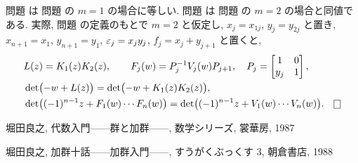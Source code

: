 \documentclass[12pt,twoside]{jarticle}
\begin{document}
\begin{rem}
  問題  は
  問題  の $m=1$ の場合に等しい.
  問題  は
  問題  の $m=2$ の場合と同値である.
  実際, 問題  の定義のもとで %
  $m=2$ と仮定し,  $x_j=x_{1j}$, $y_j=y_{2j}$ と置き, 
  $x_{n+1}=x_1$, $y_{n+1}=y_1$, 
  $\varepsilon_j = x_jy_j$, $f_j = x_j+y_{j+1}$ と置くと, 
  \begin{align*}
    &
    L(z) = K_1(z)K_2(z),
    \qquad
    F_j(w) = P_j^{-1} V_j(w) P_{j+1},
    \quad
    P_j = 
    \begin{bmatrix}
      1   & 0 \\
      y_j & 1 \\
    \end{bmatrix},
    \\ &
    \det\bigl( -w + L(z) \bigr)
    =
    \det\bigl( -w + K_1(z)K_2(z) \bigr),
    \\ &
    \det\bigl( (-1)^{n-1}z + F_1(w)\cdots F_n(w) \bigr)
    =
    \det\bigl( (-1)^{n-1}z + V_1(w)\cdots V_n(w) \bigr).
    \qed
  \end{align*}
\end{rem}


\begin{thebibliography}{ABC}
%
%

堀田良之, 代数入門——群と加群——, 数学シリーズ, 裳華房, 1987

堀田良之, 加群十話——加群入門——, すうがくぶっくす 3, 朝倉書店, 1988



\end{thebibliography}

\end{document}

